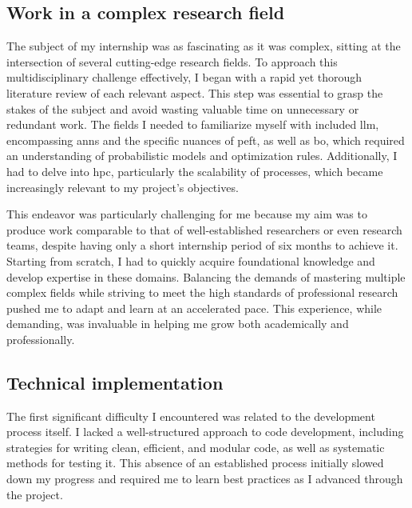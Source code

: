 \subsection{Work in a complex research field}
\label{sec:complex_field}
The subject of my internship was as fascinating as it was complex, sitting at the intersection of several cutting-edge research fields. To approach this multidisciplinary challenge effectively, I began with a rapid yet thorough literature review of each relevant aspect. This step was essential to grasp the stakes of the subject and avoid wasting valuable time on unnecessary or redundant work. The fields I needed to familiarize myself with included \acrshort{llm}, encompassing \acrshort{ann}s and the specific nuances of \acrlong{peft}, as well as \acrlong{bo}, which required an understanding of probabilistic models and optimization rules. Additionally, I had to delve into \acrfull{hpc}, particularly the scalability of processes, which became increasingly relevant to my project’s objectives.

This endeavor was particularly challenging for me because my aim was to produce work comparable to that of well-established researchers or even research teams, despite having only a short internship period of six months to achieve it. Starting from scratch, I had to quickly acquire foundational knowledge and develop expertise in these domains. Balancing the demands of mastering multiple complex fields while striving to meet the high standards of professional research pushed me to adapt and learn at an accelerated pace. This experience, while demanding, was invaluable in helping me grow both academically and professionally.


\subsection{Technical implementation}
\label{sec:tech_impl}


The first significant difficulty I encountered was related to the development process itself. I lacked a well-structured approach to code development, including strategies for writing clean, efficient, and modular code, as well as systematic methods for testing it. This absence of an established process initially slowed down my progress and required me to learn best practices as I advanced through the project.

